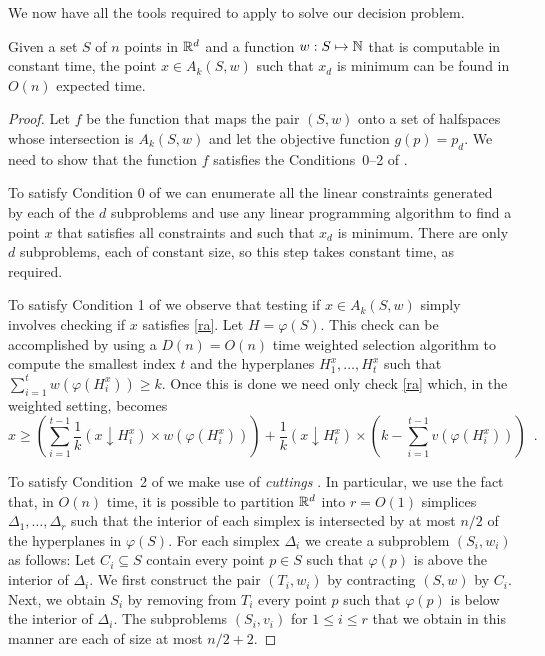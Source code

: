 \documentclass[lotsofwhite]{patmorin}
\newcommand{\drop}{\!\!\downarrow\!\!}
\newcommand{\dual}{\varphi}
\begin{document}
We now have all the tools required to apply  to solve our
decision problem.

\begin{thm}
Given a set $S$ of $n$ points in $\mathbb{R}^d$ and a 
function $w:S\mapsto\mathbb{N}$ that is computable in constant
time, the point $x\in A_k(S,w)$ such
that $x_d$ is minimum can be found in $O(n)$ expected
time.
\end{thm}

\begin{proof}
Let $f$ be the function that maps the pair $(S,w)$ onto a set of
halfspaces whose intersection is $A_k(S,w)$ and let the objective
function $g(p)=p_d$.  We need to show that the function $f$ satisfies
the Conditions~0--2 of .

To satisfy Condition 0 of  we can enumerate all the
linear constraints generated by each of the $d$ subproblems and use
any linear programming algorithm to find a point $x$ that satisfies
all constraints and such that $x_d$ is minimum.  There are only $d$
subproblems, each of constant size, so this step takes constant time,
as required.

To satisfy Condition 1 of 
we observe that testing if $x\in A_k(S,w)$
simply involves checking if $x$ satisfies \eqref{ra}.  Let
$H=\dual(S)$.  This check can be accomplished by using a $D(n)=O(n)$
time weighted selection algorithm \cite{X} to compute the smallest
index $t$ and the hyperplanes $H_{1}^x,\ldots,H_{t}^x$ such that
$\sum_{i=1}^tw(\dual(H_{i}^x)) \ge k$.  Once this is done we need only
check \eqref{ra} which, in the weighted setting, becomes 
\[
     x \ge \left(\sum_{i=1}^{t-1} \frac{1}{k}(x\drop
H_i^x)\times w(\dual(H_i^x))\right) 
   + \frac{1}{k}(x\drop H_t^x) \times \left(k-\sum_{i=1}^{t-1} v(\dual(H_{i}^x)) \right)
\enspace .
\]

To satisfy Condition~2 of 
we make use of \emph{cuttings} \cite{X}.  In
particular, we use the fact that, in $O(n)$ time, it is possible to
partition $\mathbb{R}^d$ into $r=O(1)$ simplices
$\Delta_1,\ldots,\Delta_r$ such that the interior of each simplex is
intersected by at most $n/2$ of the hyperplanes in $\dual(S)$.  For
each simplex $\Delta_i$ we create a subproblem $(S_i,w_i)$ as follows:
Let $C_i\subseteq S$ contain every point $p\in S$ such that $\dual(p)$
is above the interior of $\Delta_i$.  We first construct the pair
$(T_i,w_i)$ by contracting $(S,w)$ by $C_i$.  Next, we obtain $S_i$ by
removing from $T_i$ every point $p$ such that $\dual(p)$ is below the
interior of $\Delta_i$.  The subproblems $(S_i,v_i)$ for $1\le i\le r$
that we obtain in this manner are each of size at most $n/2+2$.


\end{proof}
\end{document}
